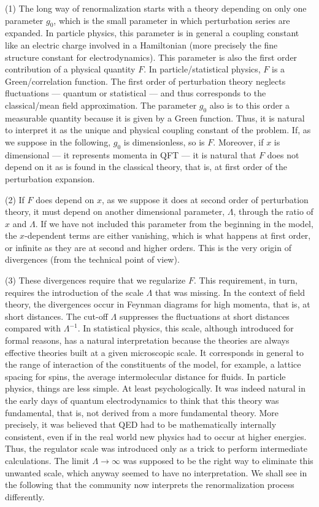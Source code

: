 \documentclass[floatfix,twocolumn,preprintnumbers,amsmath,amssymb,prb]{revtex4}
\begin{document}
{(1) The long way of renormalization starts with a theory
depending on only one parameter $g_0$, which is the small
parameter in which perturbation series are expanded. In particle
physics, this parameter is in general a coupling constant like an
electric charge involved in a Hamiltonian (more precisely the fine
structure constant for electrodynamics). This parameter is also
the first order contribution of a physical quantity $F$. In
particle/statistical physics,
$F$ is a Green/correlation function. The first order of
perturbation theory neglects fluctuations --- quantum or
statistical --- and thus corresponds to the classical/mean field
approximation. The parameter $g_0$ also is to this order a
measurable quantity because it is given by a Green function. Thus,
it is natural to interpret it as the unique and physical coupling
constant of the problem. If, as we suppose in the following, $g_0$
is dimensionless, so is $F$. Moreover, if $x$ is dimensional ---
it represents momenta in QFT --- it is natural that $F$ does not 
depend on it as is found in the classical theory, that is, at
first order of the perturbation expansion.

(2) If $F$ does depend on $x$, as we suppose it does at second
order of perturbation theory, it must depend on another
dimensional parameter, $\Lambda$, through the ratio of $x$ and 
$\Lambda$. If we have not included this parameter from the
beginning in the model, the $x$-dependent terms are either
vanishing, which is what happens at first order, or infinite as
they are at second and higher orders. This is the very origin of
divergences (from the technical point of view).

(3) These divergences require that we regularize $F$. This
requirement, in turn, requires the introduction of the scale
$\Lambda$ that was missing. In the context of field theory, the
divergences occur in Feynman diagrams for high momenta, that is,
at short distances. The cut-off
$\Lambda$ suppresses the fluctuations at short distances compared
with $\Lambda^{-1}$. In statistical physics, this scale, although
 introduced for formal reasons, has a natural
interpretation because the theories are always 
effective theories built at a given microscopic scale. It
corresponds in general to the range of interaction of the
constituents of the model, for example, a lattice spacing for
spins, the average intermolecular distance for fluids. In
particle physics, things are less simple. At least
psychologically. It was indeed natural in the early days of
quantum electrodynamics to think that this theory was fundamental,
that is, not derived from a more fundamental theory. More
precisely, it was believed that QED had to be mathematically
internally consistent, even if in the real world new physics had to
occur at higher energies. Thus, the regulator scale was introduced
only as a trick to perform intermediate calculations. The limit
$\Lambda\to\infty$ was supposed to be the right way to eliminate
this unwanted scale, which anyway seemed to have no interpretation.
We shall see in the following that the community now interprets 
the renormalization process differently.

}
\end{document}
